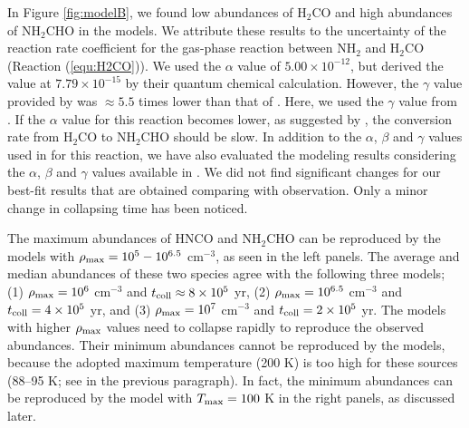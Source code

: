\documentclass[twocolumn, twocolappendix]{aastex631}
\begin{document}
In Figure \ref{fig:modelB}, we found low abundances of H$_{2}$CO and high abundances of NH$_{2}$CHO in the models.
We attribute these results to the uncertainty of the reaction rate coefficient for the gas-phase reaction between NH$_{2}$ and H$_{2}$CO (Reaction (\ref{equ:H2CO})).
We used the $\alpha$ value of $5.00\times10^{-12}$, but \citet{2017MNRAS.468L...1S} derived the value at $7.79\times10^{-15}$ by their quantum chemical calculation.
However, the $\gamma$ value provided by \citet{2017MNRAS.468L...1S} was $\approx5.5$ times lower than that of \citet{2015MNRAS.453L..31B}.
Here, we used the $\gamma$ value from \citet{2017MNRAS.468L...1S}.
If the $\alpha$ value for this reaction becomes lower, as suggested by \citet{2017MNRAS.468L...1S}, the conversion rate from H$_{2}$CO to NH$_{2}$CHO should be slow.
In addition to the $\alpha$, $\beta$ and $\gamma$ values used in \citet{2020ApJ...895...86G} for this reaction, we have also evaluated the modeling results considering the $\alpha$, $\beta$ and $\gamma$ values available in \citet{2017MNRAS.468L...1S}. 
We did not find significant changes for our best-fit results that are obtained comparing with observation. 
Only a minor change in collapsing time has been noticed.

The maximum abundances of HNCO and NH$_{2}$CHO can be reproduced by the models with $\rho_{\rm {max}}=10^{5}-10^{6.5}$ cm$^{-3}$, as seen in the left panels. %
The average and median abundances of these two species agree with the following three models; (1) $\rho_{\rm {max}}=10^{6}$ cm$^{-3}$ and $t_{\rm {coll}}\approx8\times10^{5}$ yr, (2) $\rho_{\rm {max}}=10^{6.5}$ cm$^{-3}$ and $t_{\rm {coll}}=4\times10^{5}$ yr, and (3) $\rho_{\rm {max}}=10^{7}$ cm$^{-3}$ and $t_{\rm {coll}}=2\times10^{5}$ yr.
The models with higher $\rho_{\rm {max}}$ values need to collapse rapidly to reproduce the observed abundances.
Their minimum abundances cannot be reproduced by the models, because the adopted maximum temperature (200 K) is too high for these sources (88--95 K; see in the previous paragraph).
In fact, the minimum abundances can be reproduced by the model with $T_{\rm {max}}=100$ K in the right panels, as discussed later.
\end{document}
